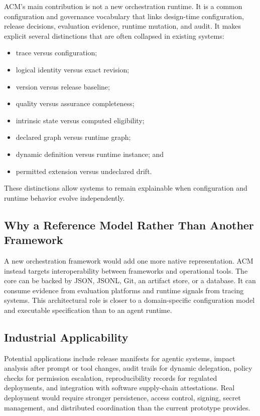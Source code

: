 \documentclass[10pt]{article}
\begin{document}
ACM's main contribution is not a new orchestration runtime. It is a common configuration and governance vocabulary that links design-time configuration, release decisions, evaluation evidence, runtime mutation, and audit. It makes explicit several distinctions that are often collapsed in existing systems:

\begin{itemize}[leftmargin=*]
  \item trace versus configuration;
  \item logical identity versus exact revision;
  \item version versus release baseline;
  \item quality versus assurance completeness;
  \item intrinsic state versus computed eligibility;
  \item declared graph versus runtime graph;
  \item dynamic definition versus runtime instance; and
  \item permitted extension versus undeclared drift.
\end{itemize}

These distinctions allow systems to remain explainable when configuration and runtime behavior evolve independently.

\subsection{Why a Reference Model Rather Than Another Framework}

A new orchestration framework would add one more native representation. ACM instead targets interoperability between frameworks and operational tools. The core can be backed by JSON, JSONL, Git, an artifact store, or a database. It can consume evidence from evaluation platforms and runtime signals from tracing systems. This architectural role is closer to a domain-specific configuration model and executable specification than to an agent runtime.

\subsection{Industrial Applicability}

Potential applications include release manifests for agentic systems, impact analysis after prompt or tool changes, audit trails for dynamic delegation, policy checks for permission escalation, reproducibility records for regulated deployments, and integration with software supply-chain attestations. Real deployment would require stronger persistence, access control, signing, secret management, and distributed coordination than the current prototype provides.
\end{document}
